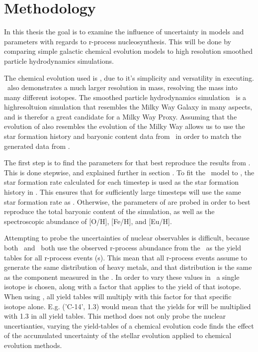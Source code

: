 \section{Methodology}

In this thesis the goal is to examine the influence of uncertainty in models and parameters
with regards to r-process nucleosynthesis. This will be done by comparing simple galactic chemical evolution models to high resolution smoothed particle hydrodynamics simulations.

The chemical evolution used is \omegamodel, due to it's simplicity and versatility in executing. \omegamodel\ also demonstrates a much larger resolution in mass, resolving the mass into many different isotopes.
The smoothed particle hydrodynamics simulation \eris\ is a highresoltuion simulation that resembles the Milky Way Galaxy in many aspects, and is therefor a great candidate for a Milky Way Proxy. Assuming that the evolution of \eris also resembles the evolution of the Milky Way allows us to use the star formation history and baryonic content data from \eris\ in order to match the generated data from \omegamodel.

The first step is to find the parameters for \omegamodel that best reproduce the results from \eris\cite{shen15}. This is done stepwise, and explained further in section .
To fit the \omegamodel\ model to \eris, the star formation rate calculated for each timestep is used as the star formation history in \omegamodel. This ensures that for sufficiently large timesteps \omegamodel will use the same star formation rate as \eris.
Otherwise, the parameters of \omegamodel are probed in order to best reproduce the total baryonic content of the simulation, as well as the spectroscopic abundance of [O/H], [Fe/H], and [Eu/H].

Attempting to probe the uncertainties of nuclear observables is difficult, because both \eris\ and \omegamodel\ both use the observed r-process abundance from the \sos\ as the yield tables for all r-process events (\nsm\-s). This mean that all r-process events assume to generate the same distribution of heavy metals, and that distribution is the same as the component measured in the \sos.
In order to vary these values in \omegamodel\ a single isotope is chosen, along with a factor that applies to the yield of that isotope. When using \omegamodel, all yield tables will multiply with this factor for that specific isotope alone. E.g. ('C-14', 1.3) would mean that the yields for  will be multiplied with 1.3 in all yield tables.
This method does not only probe the nuclear uncertianties, varying the yield-tables of a chemical evolution code finds the effect of the accumulated uncertainty of the stellar evolution applied to chemical evolution methods.

